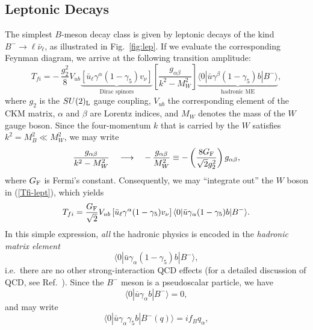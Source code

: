 \documentclass[11pt]{cernrep}
\begin{document}
\subsection{Leptonic Decays}
%
%
%
The simplest $B$-meson decay class is given by leptonic decays 
of the kind $B^-\to \ell\bar\nu_\ell$, as illustrated in Fig.~\ref{fig:lep}.
If we evaluate the corresponding Feynman diagram, we arrive at the 
following transition amplitude:
\begin{equation}\label{Tfi-lept}
T_{fi}=-\,\frac{g_2^2}{8} V_{ub}
\underbrace{\left[\bar u_\ell\gamma^\alpha(1-\gamma_5)v_\nu
\right]}_{\mbox{Dirac spinors}}
\left[\frac{g_{\alpha\beta}}{k^2-M_W^2}\right]
\underbrace{\langle 0|\bar u\gamma^\beta
(1-\gamma_5)b|B^-\rangle}_{\mbox{hadronic ME}},
\end{equation}
where $g_2$ is the $SU(2)_{\rm L}$ gauge coupling, $V_{ub}$ the corresponding
element of the CKM matrix, $\alpha$ and $\beta$ are Lorentz indices,
and $M_W$ denotes the mass of the $W$ gauge boson. Since the four-momentum
$k$ that is carried by the $W$ satisfies $k^2=M_B^2\ll M_W^2$, we may
write
\begin{equation}\label{W-int-out}
\frac{g_{\alpha\beta}}{k^2-M_W^2}\quad\longrightarrow\quad
-\,\frac{g_{\alpha\beta}}{M_W^2}\equiv-\left(\frac{8G_{\rm F}}{\sqrt{2}g_2^2}
\right)g_{\alpha\beta},
\end{equation}
where $G_{\rm F}$ is Fermi's constant. Consequently, we may ``integrate out'' 
the $W$ boson in (\ref{Tfi-lept}), which yields
\begin{equation}\label{Tfi-lept-2}
T_{fi}=\frac{G_{\rm F}}{\sqrt{2}}V_{ub}\left[\bar u_\ell\gamma^\alpha
(1-\gamma_5)v_\nu\right]\langle 0|\bar u\gamma_\alpha(1-\gamma_5)b
|B^-\rangle.
\end{equation}
In this simple expression, {\it all} the hadronic physics is encoded 
in the {\it hadronic matrix element} 
\begin{displaymath}
\langle 0|\bar u\gamma_\alpha(1-\gamma_5)b
|B^-\rangle,
\end{displaymath}
i.e.\ there are no other strong-interaction QCD effects (for a detailed discussion
of QCD, see Ref.~\cite{ecker}). Since the $B^-$ meson is a pseudoscalar particle, 
we have
\begin{equation}\label{ME-rel1}
\langle 0|\overline{u}\gamma_\alpha b|B^-\rangle=0,
\end{equation}
and may write
\begin{equation}\label{ME-rel2}
\langle 0|\bar u\gamma_\alpha\gamma_5 b|B^-(q)\rangle =
i f_B q_\alpha,
\end{equation}
\end{document}
